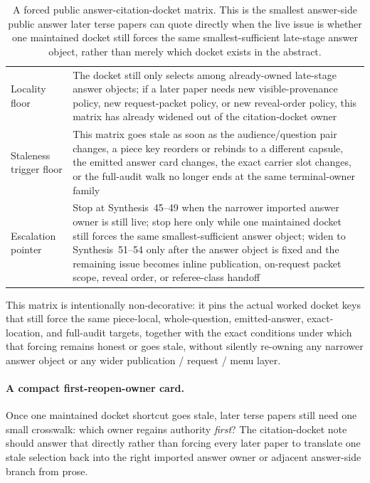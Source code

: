 \documentclass[11pt]{article}
\begin{document}
\begin{table}[t]
\begin{tabularx}{\linewidth}{@{}lX@{}}
Locality floor & The docket still only selects among already-owned late-stage answer objects; if a later paper needs new visible-provenance policy, new request-packet policy, or new reveal-order policy, this matrix has already widened out of the citation-docket owner \\
Staleness trigger floor & This matrix goes stale as soon as the audience/question pair changes, a piece key reorders or rebinds to a different capsule, the emitted answer card changes, the exact carrier slot changes, or the full-audit walk no longer ends at the same terminal-owner family \\
Escalation pointer & Stop at Synthesis~45--49 when the narrower imported answer owner is still live; stop here only while one maintained docket still forces the same smallest-sufficient answer object; widen to Synthesis~51--54 only after the answer object is fixed and the remaining issue becomes inline publication, on-request packet scope, reveal order, or referee-class handoff \\
\bottomrule
\end{tabularx}
\caption{A forced public answer-citation-docket matrix. This is the smallest answer-side public answer later terse papers can quote directly when the live issue is whether one maintained docket still forces the same smallest-sufficient late-stage answer object, rather than merely which docket exists in the abstract.}
\label{tab:forced-public-answer-citation-docket-matrix}
\end{table}

This matrix is intentionally non-decorative: it pins the actual worked docket keys that still force the same piece-local, whole-question, emitted-answer, exact-location, and full-audit targets, together with the exact conditions under which that forcing remains honest or goes stale, without silently re-owning any narrower answer object or any wider publication / request / menu layer.\cite{series:workedexample}

\paragraph{A compact first-reopen-owner card.}
Once one maintained docket shortcut goes stale, later terse papers still need one small crosswalk: which owner regains authority \emph{first}? The citation-docket note should answer that directly rather than forcing every later paper to translate one stale selection back into the right imported answer owner or adjacent answer-side branch from prose.
\end{document}
